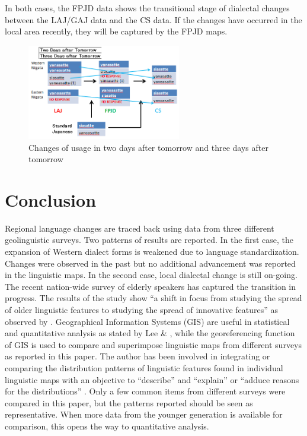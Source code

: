 \documentclass[output=paper]{LSP/langsci}
\begin{document}
In both cases, the FPJD data shows the transitional stage of dialectal changes between the LAJ/GAJ data and the CS data. If the changes have occurred in the local area recently, they will be captured by the FPJD maps.

\begin{figure}
\includegraphics[width=0.6\textwidth]{illustrations/fuku2_fig7}
\caption{Changes of usage in {\textquotedbl}two days after tomorrow{\textquotedbl} and {\textquotedbl}three days after tomorrow{\textquotedbl}}
\label{fig:7}
\end{figure}

\section{Conclusion}

Regional language changes are traced back using data from three different geolinguistic surveys.  Two patterns of results are reported.  In the first case, the expansion of Western dialect forms is weakened due to language standardization.  Changes were observed in the past but no additional advancement was reported in the linguistic maps.  In the second case, local dialectal change is still on-going.  The recent nation-wide survey of elderly speakers has captured the transition in progress.  The results of the study show “a shift in focus from studying the spread of older linguistic features to studying the spread of innovative features” as observed by \citet[412]{gordon_changes_2000}.  Geographical Information Systems (GIS) are useful in statistical and quantitative analysis as stated by Lee \& \citet{lee_spatial_1993}, while the georeferencing function of GIS is used to compare and superimpose linguistic maps from different surveys as reported in this paper.  The author has been involved in integrating or comparing the distribution patterns of linguistic features found in individual linguistic maps with an objective to “describe” and “explain” or “adduce reasons for the distributions” \citep[216]{trudgill_linguistic_1974}.  Only a few common items from different surveys were compared in this paper, but the patterns reported should be seen as representative. When more data from the younger generation is available for comparison, this opens the way to quantitative analysis.
\end{document}
